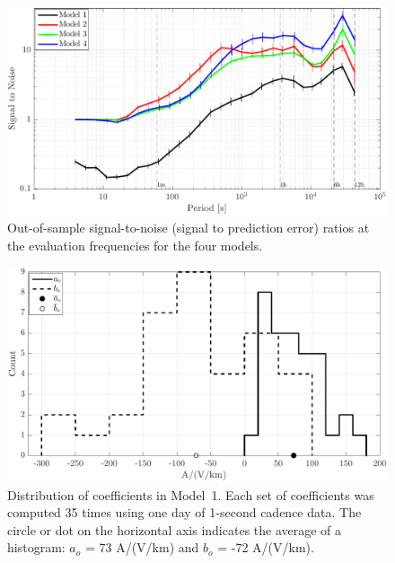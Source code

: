 \documentclass[draft,linenumbers]{agujournal2018}
\begin{document}
\begin{figure}[h]
\centering
\includegraphics[width=\textwidth]{figures/plot_model_summary_SN-options-1.pdf}
\caption{Out-of-sample signal-to-noise (signal to prediction error) ratios at the evaluation frequencies for the four models.}
\label{SN}
\end{figure}

\begin{figure}[h]
\centering
\includegraphics[width=\textwidth]{figures/plot_model_summary_aobo_histograms-options-1.pdf}
\caption{Distribution of coefficients in Model~1. Each set of coefficients was computed 35 times using one day of 1-second cadence data. The circle or dot on the horizontal axis indicates the average of a histogram: $a_o$ = 73 A/(V/km) and $b_o$ = -72 A/(V/km).}
\label{histogram}
\end{figure}
\end{document}
